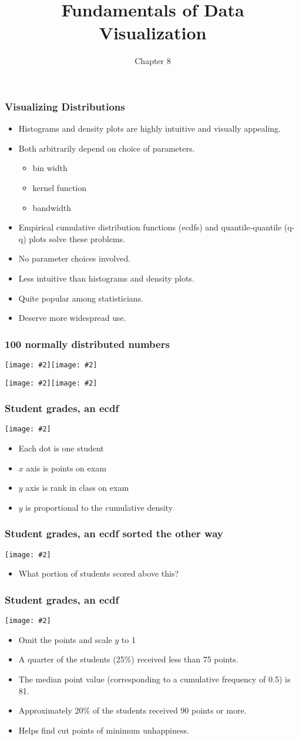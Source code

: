\documentclass{beamer}
\title{Fundamentals of Data Visualization}
\author{Chapter 8}
\newcommand{\bi}{\begin{itemize}}
\newcommand{\li}{\item}
\newcommand{\ei}{\end{itemize}}
\newcommand{\fig}[2]{\centerline{\texttt{[image: \#2]}}}
\newcommand{\figg}[2]{\texttt{[image: \#2]}}
\newcommand{\bfr}[1]{\begin{frame}[fragile]\frametitle{{ #1 }}}
\begin{document}
\begin{frame}
\maketitle
\end{frame}

\bfr{Visualizing Distributions}

\bi
\li Histograms and density plots are highly intuitive and visually appealing.
\li Both arbitrarily depend on choice of parameters.
\bi \li bin width \li kernel function \li bandwidth \ei
\li Empirical cumulative distribution functions (ecdfs) and quantile-quantile (q-q) plots
solve these problems.
\li No parameter choices involved.
\li Less intuitive than histograms and density plots.
\li Quite popular among statisticians.
\li Deserve more widespread use.
\ei

\end{frame}

\bfr{100 normally distributed numbers}

\figg{.42}{normalpoints}\hfill\figg{.42}{normalhistogram.png}

\figg{.42}{normalsorted.png}\hfill\figg{.42}{normalecdf.png}

\end{frame}

\bfr{Student grades, an ecdf}

\fig{.8}{student-grades-1.png}

\scriptsize
\bi
\li Each dot is one student
\li $x$ axis is points on exam
\li $y$ axis is rank in class on exam
\li $y$ is proportional to the cumulative density
\ei

\end{frame}
\bfr{Student grades, an ecdf sorted the other way}

\fig{.8}{student-grades-desc-1.png}

\bi
\li What portion of students scored above this?
\ei
\end{frame}

\bfr{Student grades, an ecdf}

\fig{.8}{student-grades-normalized-1.png}
\scriptsize
\bi
\li Omit the points and scale $y$ to 1
\li A quarter of the students (25\%) received less than 75 points.
\li The median point value (corresponding to a cumulative frequency of 0.5) is 81.
\li Approximately 20\% of the students received 90 points or more.
\li Helps find cut points of minimum unhappiness.
\ei
\end{frame}
\end{document}
